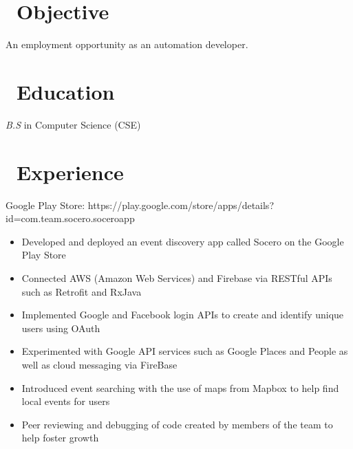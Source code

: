 \documentclass{resume}
\begin{document}



\section{\faSearch\ Objective}
An employment opportunity as an automation developer.

\section{\faGraduationCap\ Education}
\textit{B.S} in Computer Science (CSE)

\section{\faUsers\ Experience}
\role{Android Developer}

Google Play Store: {\color{blue}https://play.google.com/store/apps/details?id=com.team.socero.soceroapp}
\begin{itemize}
  \item Developed and deployed an event discovery app called Socero on the Google Play Store 
  \item Connected AWS (Amazon Web Services) and Firebase via RESTful APIs such as Retrofit and RxJava
  \item Implemented Google and Facebook login APIs to create and identify unique users using OAuth
  \item Experimented with Google API services such as Google Places and People as well as cloud messaging via FireBase
  \item Introduced event searching with the use of maps from Mapbox to help find local events for users
  \item Peer reviewing and debugging of code created by members of the team to help foster growth
\end{itemize}

\end{document}
